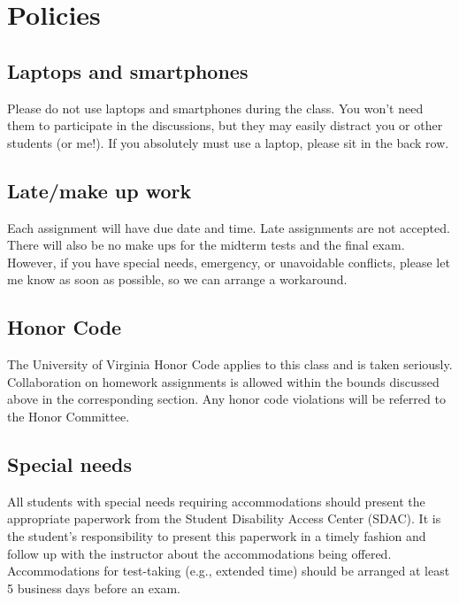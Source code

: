 \documentclass[oneside,11pt]{amsart}
\begin{document}
\section{Policies}

\subsection{Laptops and smartphones}

Please do not use laptops and smartphones during the class.
You won't need them to participate in the discussions, but they may easily distract 
you or other students (or me!). If you absolutely must use a laptop, please sit in the back row.

\subsection{Late/make up work} Each assignment will have due date and time.
Late assignments are not accepted. There will also be no make ups for the midterm tests and the final exam.
However, if you have special needs, emergency, or unavoidable conflicts, please
let me know as soon as possible, so we can arrange a workaround.

\subsection{Honor Code} The University of Virginia Honor Code applies to this
class and is taken seriously. Collaboration on homework
assignments is allowed within the bounds discussed above 
in the corresponding section.
Any honor code violations will be referred to the
Honor Committee.

\subsection{Special needs}

All students with special needs requiring accommodations should present the
appropriate paperwork from the Student Disability Access Center (SDAC). It is
the student's responsibility to present this paperwork in a timely fashion and
follow up with the instructor about the accommodations being offered.
Accommodations for test-taking (e.g., extended time) should be arranged at
least 5 business days before an exam.
\end{document}
